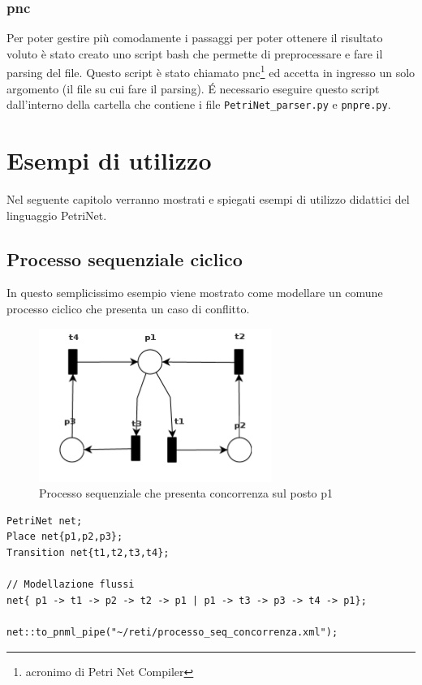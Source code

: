 \documentclass[italian,12pt]{book}
\begin{document}
\subsection{pnc}
Per poter gestire più comodamente i passaggi per poter ottenere il
risultato voluto è stato creato uno script bash che permette di
preprocessare e fare il parsing del file. Questo script è stato
chiamato pnc\footnote{acronimo di Petri Net Compiler} ed accetta in
ingresso un solo argomento (il file su cui fare il parsing). \'E
necessario eseguire questo script dall'interno della cartella che
contiene i file {\tt PetriNet\_parser.py} e {\tt pnpre.py}.


\chapter{Esempi di utilizzo}\label{cap:esempi}
Nel seguente capitolo verranno mostrati e spiegati esempi di utilizzo didattici del linguaggio PetriNet.

\section{Processo sequenziale ciclico}
In questo semplicissimo esempio viene mostrato come modellare un comune processo ciclico che presenta un caso di conflitto.
\begin{figure}[htb]
\centerline{\includegraphics[height=5cm]{img/processo_seq_concorrenza.png}}
\caption{Processo sequenziale che presenta concorrenza sul posto p1}\label{fig:processo_seq_concorrenza.png}
\end{figure}

\begin{verbatim}PetriNet net;
Place net{p1,p2,p3};
Transition net{t1,t2,t3,t4};

// Modellazione flussi
net{ p1 -> t1 -> p2 -> t2 -> p1 | p1 -> t3 -> p3 -> t4 -> p1};

net::to_pnml_pipe("~/reti/processo_seq_concorrenza.xml");
\end{verbatim}
\end{document}
